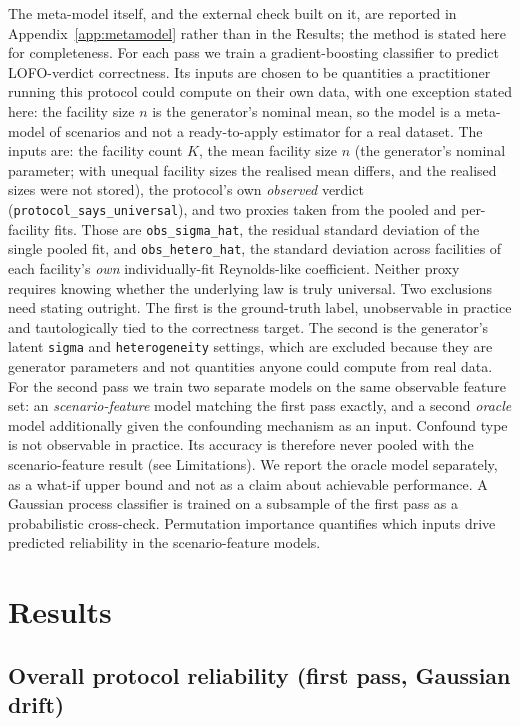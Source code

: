 \documentclass[journal=dce]{CUP-JNL-DTM}%
\begin{document}
The meta-model itself, and the external check built on it, are reported in Appendix~\ref{app:metamodel} rather than in the Results; the method is stated here for completeness. For each pass we train a gradient-boosting classifier to predict LOFO-verdict correctness. Its inputs are chosen to be quantities a practitioner running this protocol could compute on their own data, with one exception stated here: the facility size $n$ is the generator's nominal mean, so the model is a meta-model of scenarios and not a ready-to-apply estimator for a real dataset. The inputs are: the facility count $K$, the mean facility size $n$ (the generator's nominal parameter; with unequal facility sizes the realised mean differs, and the realised sizes were not stored), the protocol's own \emph{observed} verdict (\texttt{protocol\_says\_universal}), and two proxies taken from the pooled and per-facility fits. Those are \texttt{obs\_sigma\_hat}, the residual standard deviation of the single pooled fit, and \texttt{obs\_hetero\_hat}, the standard deviation across facilities of each facility's \emph{own} individually-fit Reynolds-like coefficient. Neither proxy requires knowing whether the underlying law is truly universal. Two exclusions need stating outright. The first is the ground-truth label, unobservable in practice and tautologically tied to the correctness target. The second is the generator's latent \texttt{sigma} and \texttt{heterogeneity} settings, which are excluded because they are generator parameters and not quantities anyone could compute from real data. For the second pass we train two separate models on the same observable feature set: an \emph{scenario-feature} model matching the first pass exactly, and a second \emph{oracle} model additionally given the confounding mechanism as an input. Confound type is not observable in practice. Its accuracy is therefore never pooled with the scenario-feature result (see Limitations). We report the oracle model separately, as a what-if upper bound and not as a claim about achievable performance. A Gaussian process classifier is trained on a subsample of the first pass as a probabilistic cross-check. Permutation importance quantifies which inputs drive predicted reliability in the scenario-feature models.

\section{Results}
\label{sec:results-v1}

\subsection{Overall protocol reliability (first pass, Gaussian drift)}
\end{document}
